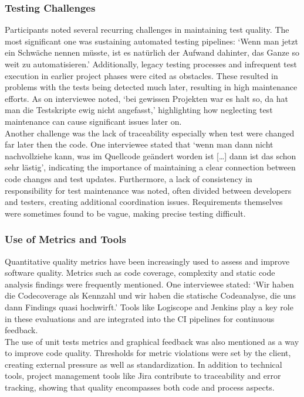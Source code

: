 \subsubsection{Testing Challenges}
Participants noted several recurring challenges in maintaining test quality. The most significant one was sustaining automated testing pipelines: `Wenn man jetzt ein Schwäche nennen müsste, ist es natürlich der Aufwand dahinter, das Ganze so weit zu automatisieren.'
Additionally, legacy testing processes and infrequent test execution in earlier project phases were cited as obstacles. These resulted in problems with the tests being detected much later, resulting in high maintenance efforts. 
As on interviewee noted, `bei gewissen Projekten war es halt so, da hat man die Testskripte ewig nicht angefasst,' highlighting how neglecting test maintenance can cause significant issues later on.\\
Another challenge was the lack of traceability especially when test were changed far later then the code. One interviewee stated that `wenn man dann nicht nachvollziehe kann, was im Quellcode geändert worden ist [\ldots] dann ist das schon sehr lästig', indicating
the importance of maintaining a clear connection between code changes and test updates. Furthermore, a lack of consistency in responsibility for test maintenance was noted, often divided between developers and testers, creating additional coordination issues.
Requirements themselves were sometimes found to be vague, making precise testing difficult.\\

\subsubsection{Use of Metrics and Tools}
Quantitative quality metrics have been increasingly used to assess and improve software quality. Metrics such as code coverage, complexity and static code analysis findings were frequently mentioned. One interviewee stated: `Wir haben die Codecoverage als Kennzahl und wir haben die statische Codeanalyse,
die uns dann Findings quasi hochwirft.' Tools like Logiscope and Jenkins play a key role in these evaluations and are integrated into the CI pipelines for continuous feedback.\\
The use of unit tests metrics and graphical feedback was also mentioned as a way to improve code quality. Thresholds for metric violations were set by the client, creating external pressure as well as standardization. In addition to technical tools, project management tools like Jira contribute to traceability and error tracking,
showing that quality encompasses both code and process aspects.\\

